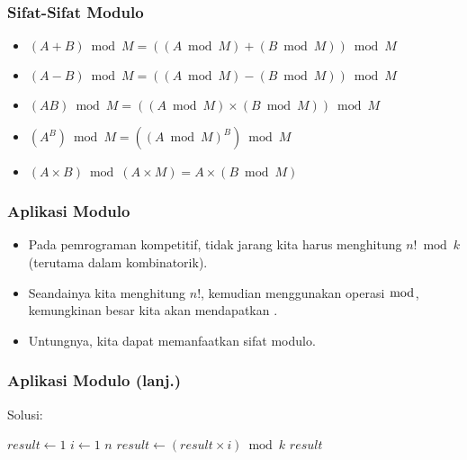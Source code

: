 \begin{frame}
\frametitle{Sifat-Sifat Modulo}
\begin{itemize}
  \item $(A + B) \bmod M = ((A \bmod M) + (B \bmod M)) \bmod M$
  \item $(A - B) \bmod M = ((A \bmod M) - (B \bmod M)) \bmod M$
  \item $(AB) \bmod M = ((A \bmod M) \times (B \bmod M)) \bmod M$  
  \item $(A^{B}) \bmod M = ((A \bmod M)^{B}) \bmod M$
  \item $(A \times B) \bmod (A \times M) = A \times (B \bmod M)$
\end{itemize}
\end{frame} 

\begin{frame}
\frametitle{Aplikasi Modulo}
\begin{itemize}
  \item Pada pemrograman kompetitif, tidak jarang kita harus menghitung $n! \bmod k$ (terutama dalam kombinatorik). 
  \item Seandainya kita menghitung $n!$, kemudian menggunakan operasi $\bmod$, kemungkinan besar kita akan mendapatkan .
  \item Untungnya, kita dapat memanfaatkan sifat modulo.
\end{itemize}
\end{frame}

\begin{frame}[fragile]
\frametitle{Aplikasi Modulo (lanj.)}
Solusi: 

\begin{codebox}
\li $result \gets 1$
\li \For $i \gets 1$ \To $n$
    \Do
\li   $result \gets (result \times i) \bmod k$
    \End
\li \Return $result$    
\end{codebox}

\end{frame}

